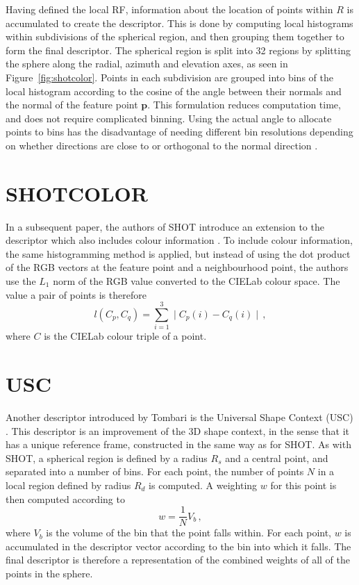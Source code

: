 \documentclass[11pt,a4paper]{kth-mag}
\begin{document}
Having defined the local RF, information about the location of points within $R$
is accumulated to create the descriptor. This is done by computing local
histograms within subdivisions of the spherical region, and then grouping them
together to form the final descriptor. The spherical region is split into 32
regions by splitting the sphere along the radial, azimuth and elevation axes, as
seen in Figure~\ref{fig:shotcolor}. Points in each subdivision are grouped into
bins of the local histogram according to the cosine of the angle between their
normals and the normal of the feature point $\mathbf{p}$. This formulation
reduces computation time, and does not require complicated binning. Using the
actual angle to allocate points to bins has the disadvantage of needing
different bin resolutions depending on whether directions are close to or
orthogonal to the normal direction \cite{tombari2010unique}.

\section{SHOTCOLOR}
In a subsequent paper, the authors of SHOT introduce an extension to the
descriptor which also includes colour information \cite{tombari2011combined}. To
include colour information, the same histogramming method is applied, but
instead of using the dot product of the RGB vectors at the feature point and a
neighbourhood point, the authors use the $L_1$ norm of the RGB value converted
to the CIELab colour space. The value a pair of points is therefore
\begin{equation}
  \label{eq:17}
  l(C_p, C_q)=\sum^3_{i=1}\mid C_p(i)-C_q(i)\mid\,,
\end{equation}
where $C$ is the CIELab colour triple of a point.

\section{USC}
Another descriptor introduced by Tombari is the Universal Shape Context (USC)
\cite{tombari2010uniquesc}. This descriptor is an improvement of the 3D shape
context, in the sense that it has a unique reference frame, constructed in the
same way as for SHOT. As with SHOT, a spherical region is defined by a radius
$R_s$ and a central point, and separated into a number of bins. For each point,
the number of points $N$ in a local region defined by radius $R_d$ is computed.
A weighting $w$ for this point is then computed according to
\begin{equation}
  \label{eq:18}
  w=\frac{1}{N}V_b\,,
\end{equation}
where $V_b$ is the volume of the bin that the point falls within. For each
point, $w$ is accumulated in the descriptor vector according to the bin into
which it falls. The final descriptor is therefore a representation of the
combined weights of all of the points in the sphere.
\end{document}

